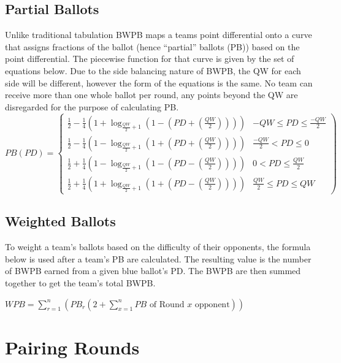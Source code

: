 \documentclass{article}
\begin{document}
\subsection{Partial Ballots}
Unlike traditional tabulation BWPB maps a teams point differential onto a curve that assigns fractions of the ballot (hence ``partial'' ballots (PB)) based on the point differential. The piecewise function for that curve is given by the set of equations below. Due to the side balancing nature of BWPB, the QW for each side will be different, however the form of the equations is the same. No team can receive more than one whole ballot per round, any points beyond the QW are disregarded for the purpose of calculating PB.\\
\begin{displaymath}
   PB(PD) = \left\{
     \begin{array}{lr}
       \frac{1}{2}-\frac{1}{4}\left(1+\log_{\frac{QW}{2}+1}\left(1-\left(PD+\left(\frac{QW}{2}\right)\right)\right)\right) &  -QW\le PD\le \frac{-QW}{2}\\
       \frac{1}{2}-\frac{1}{4}\left(1-\log_{\frac{QW}{2}+1}\left(1+\left(PD+\left(\frac{QW}{2}\right)\right)\right)\right) &  \frac{-QW}{2}<PD\le 0\\
       \frac{1}{2}+\frac{1}{4}\left(1-\log_{\frac{QW}{2}+1}\left(1-\left(PD-\left(\frac{QW}{2}\right)\right)\right)\right) &  0<PD\le\frac{QW}{2}\\
       \frac{1}{2}+\frac{1}{4}\left(1+\log_{\frac{QW}{2}+1}\left(1+\left(PD-\left(\frac{QW}{2}\right)\right)\right)\right) & \frac{QW}{2}\le PD \le QW
     \end{array}
  \right)
\end{displaymath}
\subsection{Weighted Ballots}
To weight a team's ballots based on the difficulty of their opponents, the formula below is used after a team's PB are calculated. The resulting value is the number of BWPB earned from a given blue ballot's PD. The BWPB are then summed together to get the team's total BWPB.

\begin{center}$WPB=\sum\limits_{r=1}^{n} \left(PB_{r}\left(2+\sum\limits_{x=1}^{n}\mbox{$PB$ of Round $x$ opponent}\right)\right)$\end{center}

\section{Pairing Rounds}
\label{roundPairing}
\end{document}
